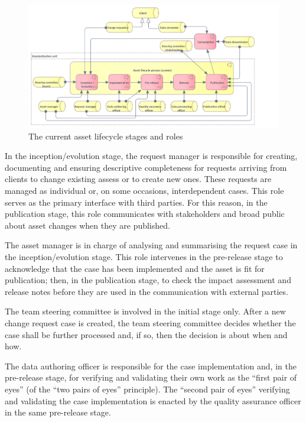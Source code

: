	\begin{figure}[h]
		\centering
		\includegraphics[width=1.05\textwidth]{images/business/Lifecycle (current).png}
		\caption{The current asset lifecycle stages and roles}
		\label{fig:lifecycle-current}
	\end{figure} 
	
	In the inception/evolution stage, the request manager is responsible for creating, documenting and ensuring descriptive completeness for requests arriving from clients to change existing assess or to create new ones. These requests are managed as individual or, on some occasions, interdependent cases. This role serves as the primary interface with third parties. For this reason, in the publication stage, this role communicates with stakeholders and broad public about asset changes when they are published.
	
	The asset manager is in charge of analysing and summarising the request case in the inception/evolution stage. This role intervenes in the pre-release stage to acknowledge that the case has been implemented and the asset is fit for publication; then, in the publication stage, to check the impact assessment and release notes before they are used in the communication with external parties.
	
	The team steering committee is involved in the initial stage only. After a new change request case is created, the team steering committee decides whether the case shall be further processed and, if so, then the decision is about when and how.
	
	The data authoring officer is responsible for the case implementation and, in the pre-release stage, for verifying and validating their own work as the ``first pair of eyes'' (of the ``two pairs of eyes'' principle). The ``second pair of eyes'' verifying and validating the case implementation is enacted by the quality assurance officer in the same pre-release stage.
	
